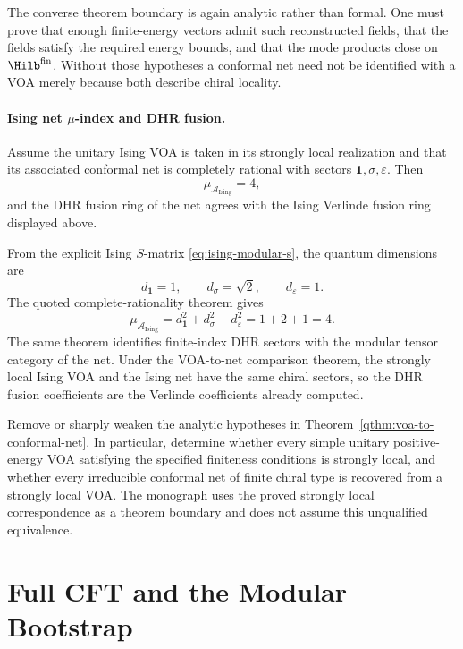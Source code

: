 The converse theorem boundary is again analytic rather than formal.  One
must prove that enough finite-energy vectors admit such reconstructed fields,
that the fields satisfy the required energy bounds, and that the mode
products close on \(\Hilb^{\mathrm{fin}}\).  Without those hypotheses a
conformal net need not be identified with a VOA merely because both describe
chiral locality.

\paragraph{Ising net \(\mu\)-index and DHR fusion.}
Assume the unitary Ising VOA is taken in its strongly local realization and
that its associated conformal net is completely rational with sectors
\(\mathbf 1,\sigma,\varepsilon\).  Then
\[
  \mu_{\mathcal A_{\mathrm{Ising}}}=4,
\]
and the DHR fusion ring of the net agrees with the Ising Verlinde fusion
ring displayed above.

From the explicit Ising \(S\)-matrix \eqref{eq:ising-modular-s}, the quantum
dimensions are
\[
  d_{\mathbf 1}=1,\qquad d_\sigma=\sqrt2,\qquad d_\varepsilon=1.
\]
The quoted complete-rationality theorem gives
\[
  \mu_{\mathcal A_{\mathrm{Ising}}}
  =
  d_{\mathbf 1}^2+d_\sigma^2+d_\varepsilon^2
  =
  1+2+1=4.
\]
The same theorem identifies finite-index DHR sectors with the modular tensor
category of the net.  Under the VOA-to-net comparison theorem, the strongly
local Ising VOA and the Ising net have the same chiral sectors, so the DHR
fusion coefficients are the Verlinde coefficients already computed.

\begin{openproblem}
\label{op:voa-net-equivalence-without-extra-hypotheses}
Remove or sharply weaken the analytic hypotheses in
Theorem~\ref{qthm:voa-to-conformal-net}.  In particular, determine whether
every simple unitary positive-energy VOA satisfying the specified finiteness
conditions is strongly local, and whether every irreducible conformal net of
finite chiral type is recovered from a strongly local VOA.  The monograph
uses the proved strongly local correspondence as a theorem boundary and does
not assume this unqualified equivalence.
\end{openproblem}

\section{Full CFT and the Modular Bootstrap}

